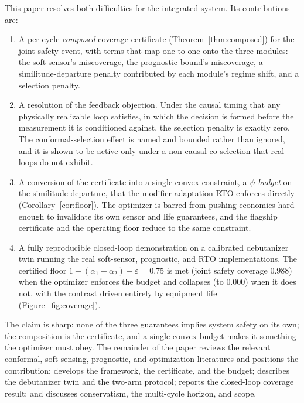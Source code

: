 This paper resolves both difficulties for the integrated system. Its contributions are:
\begin{enumerate}
\item A per-cycle \emph{composed} coverage certificate (Theorem~\ref{thm:composed}) for
the joint safety event, with terms that map one-to-one onto the three modules: the soft
sensor's miscoverage, the prognostic bound's miscoverage, a similitude-departure penalty
contributed by each module's regime shift, and a selection penalty.
\item A resolution of the feedback objection. Under the causal timing that any physically
realizable loop satisfies, in which the decision is formed before the measurement it is
conditioned against, the selection penalty is exactly zero. The conformal-selection effect
is named and bounded rather than ignored, and it is shown to be active only under a
non-causal co-selection that real loops do not exhibit.
\item A conversion of the certificate into a single convex constraint, a \emph{$\psi$-budget}
on the similitude departure, that the modifier-adaptation RTO enforces directly
(Corollary~\ref{cor:floor}). The optimizer is barred from pushing economics hard enough to
invalidate its own sensor and life guarantees, and the flagship certificate and the
operating floor reduce to the same constraint.
\item A fully reproducible closed-loop demonstration on a calibrated debutanizer twin
running the real soft-sensor, prognostic, and RTO implementations. The certified floor
$1-(\alpha_1+\alpha_2)-\varepsilon = 0.75$ is met (joint safety coverage $0.988$) when the
optimizer enforces the budget and collapses (to $0.000$) when it does not, with the
contrast driven entirely by equipment life (Figure~\ref{fig:coverage}).
\end{enumerate}

The claim is sharp: none of the three guarantees implies system safety on its own; the
composition is the certificate, and a single convex budget makes it something the optimizer
must obey. The remainder of the paper reviews the relevant
conformal, soft-sensing, prognostic, and optimization literatures and positions the
contribution; develops the framework, the certificate, and the budget; describes the
debutanizer twin and the two-arm protocol; reports the closed-loop coverage result; and
discusses conservatism, the multi-cycle horizon, and scope.
